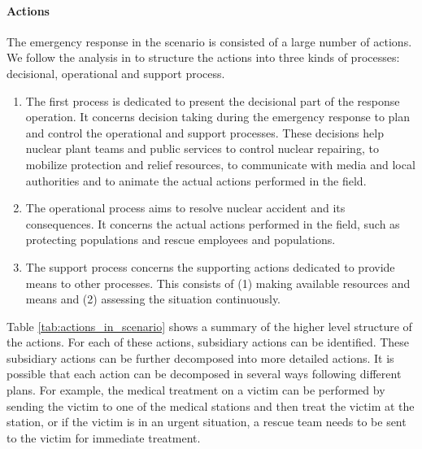 \paragraph*{Actions} %
\label{par:actions}
The emergency response in the scenario is consisted of a large number of actions. We follow the analysis in \cite{Truptil2012} to structure the actions into three kinds of processes: decisional, operational and support process.

\begin{enumerate}
	\item The first process is dedicated to present the decisional part of the response operation. It concerns decision taking during the emergency response to plan and control the operational and support processes. These decisions help nuclear plant teams and public services to control nuclear repairing, to mobilize protection and relief resources, to communicate with media and local authorities and to animate the actual actions performed in the field.
	\item The operational process aims to resolve nuclear accident and its consequences. It concerns the actual actions performed in the field, such as protecting populations and rescue employees and populations. 
	\item The support process concerns the supporting actions dedicated to provide means to other processes. This consists of (1) making available resources and means and (2) assessing the situation continuously.
\end{enumerate}

Table \ref{tab:actions_in_scenario} shows a summary of the higher level structure of the actions. For each of these actions, subsidiary actions can be identified. These subsidiary actions can be further decomposed into more detailed actions. It is possible that each action can be decomposed in several ways following different plans. For example, the medical treatment on a victim can be performed by sending the victim to one of the medical stations and then treat the victim at the station, or if the victim is in an urgent situation, a rescue team needs to be sent to the victim for immediate treatment.

